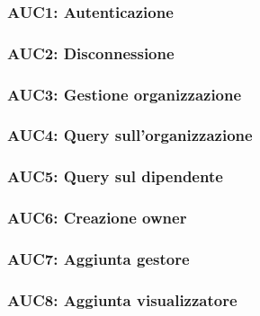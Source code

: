 \documentclass[../analisi-dei-requisiti.tex]{subfiles}
\begin{document}
\subsubsection{AUC1: Autenticazione}%
\label{subs:AUC1}



\subsubsection{AUC2: Disconnessione}%
\label{subs:AUC2}



\subsubsection{AUC3: Gestione organizzazione}%
\label{subs:AUC3}



\subsubsection{AUC4: Query sull'organizzazione}%
\label{subs:AUC4}



\subsubsection{AUC5: Query sul dipendente}%
\label{subs:AUC5}



\subsubsection{AUC6: Creazione owner}%
\label{subs:AUC6}



\subsubsection{AUC7: Aggiunta gestore}%
\label{subs:AUC7}



\subsubsection{AUC8: Aggiunta visualizzatore}%
\label{subs:AUC8}
\end{document}
